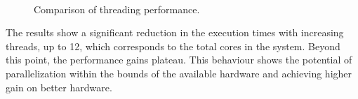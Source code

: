 \begin{figure}[htbp]
    \centering
    \\[1ex]
    \caption{Comparison of threading performance.}
    \label{fig:threading}
\end{figure}

The results show a significant reduction in the execution times with increasing threads, up to 12, which corresponds to the total cores in the system. Beyond this point, the performance gains plateau. This behaviour shows the potential of parallelization within the bounds of the available hardware and achieving higher gain on better hardware.  

